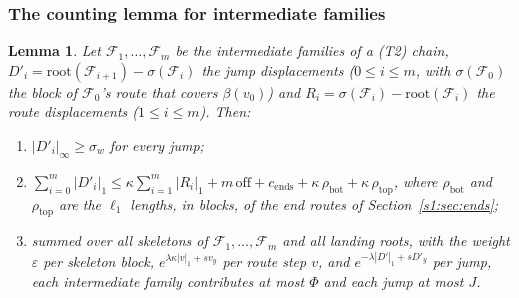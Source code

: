 \documentclass[11pt]{amsart}
\newtheorem{lemma}[theorem]{Lemma}
\theoremstyle{definition}
\theoremstyle{remark}
\numberwithin{equation}{section}
\newcommand{\cF}{\mathcal{F}}
\newcommand{\eps}{\varepsilon}
\begin{document}
\subsubsection{The counting lemma for intermediate families}
\begin{lemma}\label{s1:lem:T2}
Let $\cF_1,\dots,\cF_m$ be the intermediate families of a (T2) chain, $D'_i=\mathrm{root}(\cF_{i+1})-\sigma(\cF_i)$ the jump displacements ($0\le i\le m$, with $\sigma(\cF_0)$ the block of $\cF_0$'s route that covers $\beta(v_0)$) and $R_i=\sigma(\cF_i)-\mathrm{root}(\cF_i)$ the route displacements ($1\le i\le m$). Then:
\begin{enumerate}[label=(\roman*),leftmargin=2em]
\item $|D'_i|_\infty\ge\sigma_w$ for every jump;
\item $\sum_{i=0}^m|D'_i|_1\le\kappa\sum_{i=1}^m|R_i|_1+m\,\mathrm{off}+c_{\mathrm{ends}}+\kappa\,\rho_{\mathrm{bot}}+\kappa\,\rho_{\mathrm{top}}$, where $\rho_{\mathrm{bot}}$ and $\rho_{\mathrm{top}}$ are the $\ell_1$ lengths, in blocks, of the end routes of Section~\ref{s1:sec:ends};
\item summed over all skeletons of $\cF_1,\dots,\cF_m$ and all landing roots, with the weight $\eps$ per skeleton block, $e^{\lambda\kappa|v|_1+sv_y}$ per route step $v$, and $e^{-\lambda|D'|_1+sD'_y}$ per jump, each intermediate family contributes at most $\Phi$ and each jump at most $J$.
\end{enumerate}
\end{lemma}
\end{document}

